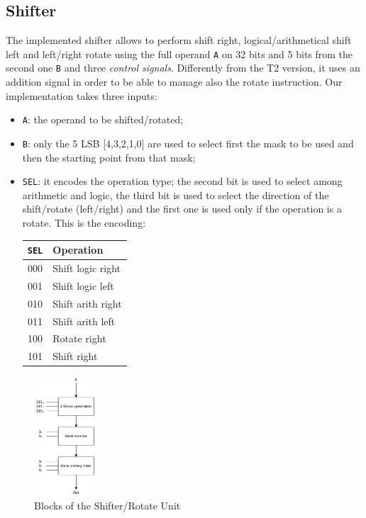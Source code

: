 \subsection{Shifter}
The implemented shifter allows to perform shift right, logical/arithmetical shift left and left/right rotate using the full operand \texttt{A} on 32 bits and 5 bits from the second one \texttt{B} and three \textit{control signals}.
Differently from the T2 version, it uses an addition signal in order to be able to manage also the rotate instruction. Our implementation takes three inputs:
\begin{itemize}
    \itemsep0sp
    \item \texttt{A}: the operand to be shifted/rotated;
    \item \texttt{B}: only the 5 LSB [4,3,2,1,0] are used to select first the mask to be used and then the starting point from that mask;
    \item \texttt{SEL}: it encodes the operation type; the second bit is used to select among arithmetic and logic, the third bit is used to select the direction of the shift/rotate (left/right) and the first one is used only if the operation is a rotate. This is the encoding:
    \begin{center}
        \begin{tabular}{c|l}
            \texttt{SEL} & \textbf{Operation}\\
            \hline
            000 & Shift logic right \\
            001 & Shift logic left \\
            010 & Shift arith right \\
            011 & Shift arith left \\
            100 & Rotate right \\
            101 & Shift right \\
        \end{tabular}
    \end{center}
\end{itemize}

\begin{figure}[ht]
    \centering
    \includegraphics[width=0.2\textwidth]{chapters/5_ExecuteStage/images/Shifter.pdf}
    \caption{Blocks of the Shifter/Rotate Unit}
    \label{fig:shifter}
\end{figure}

